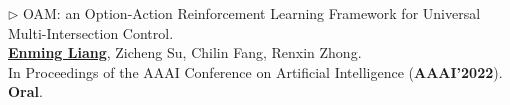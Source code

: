 \documentclass[letterpaper,11pt]{article}
\begin{document}
{      \item{$\rhd$
        OAM: an Option-Action Reinforcement Learning Framework for Universal Multi-Intersection Control. \\
        \underline{\textbf{Enming Liang}}, Zicheng Su, Chilin Fang, Renxin Zhong.\\
        In Proceedings of the AAAI Conference on Artificial Intelligence (\textbf{AAAI'2022}). \textbf{Oral}.
      }
      \vspace{5pt}
      }





\end{document}
